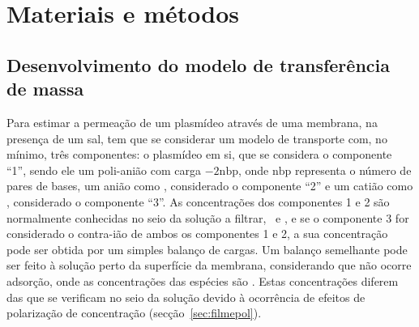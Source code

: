 \section{Materiais e métodos}
\label{sec:art2materiaisemetodos}
\subsection{Desenvolvimento do modelo de transferência de massa}
Para estimar a permeação de um plasmídeo através de uma membrana, na presença de um sal, tem que se considerar um modelo de transporte com, no mínimo, três componentes: o plasmídeo em si, que se considera o componente ``1'', sendo ele um poli-anião com carga $-2\mathrm{nbp}$, onde $\mathrm{nbp}$ representa o número de pares de bases, um anião como , considerado o componente ``2'' e um catião como , considerado o componente ``3''.
%
As concentrações dos componentes 1 e 2 são normalmente conhecidas no seio da solução a filtrar, \concbum\ e \concbdois, e se o componente 3 for considerado o contra-ião de ambos os componentes 1 e 2, a sua concentração pode ser obtida por um simples balanço de cargas. Um balanço semelhante pode ser feito à solução perto da superfície da membrana, considerando que não ocorre adsorção, onde as concentrações das espécies são \concmi. Estas concentrações diferem das que se verificam no seio da solução devido à ocorrência de efeitos de polarização de concentração (secção~\ref{sec:filmepol}).
%

